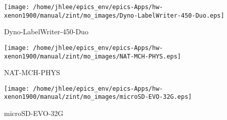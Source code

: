 \noindent
\vspace{1.4cm}
\begin{minipage}{.2\textwidth}
\begin{center}
\texttt{[image: /home/jhlee/epics\_env/epics-Apps/hw-xenon1900/manual/zint/mo\_images/Dyno-LabelWriter-450-Duo.eps]}
\end{center}
\end{minipage}
\begin{minipage}{.7\textwidth}
Dyno-LabelWriter-450-Duo
\end{minipage}


\noindent
\vspace{1.4cm}
\begin{minipage}{.2\textwidth}
\begin{center}
\texttt{[image: /home/jhlee/epics\_env/epics-Apps/hw-xenon1900/manual/zint/mo\_images/NAT-MCH-PHYS.eps]}
\end{center}
\end{minipage}
\begin{minipage}{.7\textwidth}
NAT-MCH-PHYS
\end{minipage}


\noindent
\vspace{1.4cm}
\begin{minipage}{.2\textwidth}
\begin{center}
\texttt{[image: /home/jhlee/epics\_env/epics-Apps/hw-xenon1900/manual/zint/mo\_images/microSD-EVO-32G.eps]}
\end{center}
\end{minipage}
\begin{minipage}{.7\textwidth}
microSD-EVO-32G
\end{minipage}


